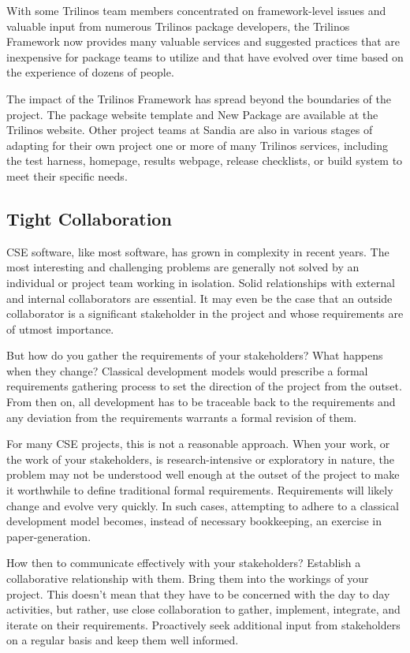 \documentclass[12pt,relax]{article}
\begin{document}
With some Trilinos team members concentrated on framework-level issues and
valuable input from numerous Trilinos package developers, the Trilinos 
Framework now provides many valuable services and suggested practices that
are inexpensive for package teams to utilize and that have evolved over 
time based on the experience of dozens of people.  

The impact of the Trilinos Framework has spread beyond the boundaries of 
the project.  The package website template and New Package are available 
at the Trilinos website.  Other project teams at Sandia are also in various
stages of adapting for their own project one or more of many Trilinos
services, including the test harness, homepage, results webpage, 
release checklists, or build system to meet their specific needs.

\subsection{Tight Collaboration}

CSE software, like most software, has grown in complexity in recent years.
The most interesting and challenging problems are generally not solved by an
individual or project team working in isolation.  Solid relationships with 
external and internal collaborators are essential.  It may even be the case
that an outside collaborator is a significant stakeholder in the project and 
whose requirements are of utmost importance.

But how do you gather the requirements of your stakeholders?  What happens
when they change?  Classical development models would prescribe a formal
requirements gathering process to set the direction of the project from the
outset.  From then on, all development has to be traceable back to the
requirements and any deviation from the requirements warrants a formal revision
of them.  

For many CSE projects, this is not a reasonable approach.  When your work, or 
the work of your stakeholders, is research-intensive or exploratory in nature, 
the problem may not be understood well enough at the outset of the project to 
make it worthwhile to define traditional formal requirements.  Requirements 
will likely change and evolve very quickly.  In such cases, attempting to
adhere to a classical development model becomes, instead of necessary
bookkeeping, an exercise in paper-generation.

How then to communicate effectively with your stakeholders?  Establish a
collaborative relationship with them.  Bring them into the workings of your
project.  This doesn't mean that they have to be concerned with the day to day
activities, but rather, use close collaboration to gather, implement,
integrate, and iterate on their requirements.  Proactively seek additional
input from stakeholders on a regular basis and keep them well informed.
\end{document}
